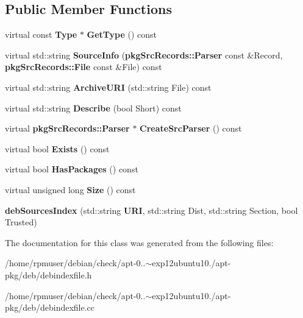 \subsection*{\-Public \-Member \-Functions}
\begin{DoxyCompactItemize}
\item 
virtual const {\bf \-Type} $\ast$ {\bfseries \-Get\-Type} () const \label{classdebSourcesIndex_a97e9791ce2bb129d7b03dfe2f55de366}

\item 
virtual std\-::string {\bfseries \-Source\-Info} ({\bf pkg\-Src\-Records\-::\-Parser} const \&\-Record, {\bf pkg\-Src\-Records\-::\-File} const \&\-File) const \label{classdebSourcesIndex_aa664249fc20599616314f091fc9a1cd0}

\item 
virtual std\-::string {\bfseries \-Archive\-U\-R\-I} (std\-::string \-File) const \label{classdebSourcesIndex_ac797e5aad2fdbc2462e14647d924185e}

\item 
virtual std\-::string {\bfseries \-Describe} (bool \-Short) const \label{classdebSourcesIndex_a1d76db0d4174d2926a4c5af85e1019d9}

\item 
virtual {\bf pkg\-Src\-Records\-::\-Parser} $\ast$ {\bfseries \-Create\-Src\-Parser} () const \label{classdebSourcesIndex_a890bdfc36ac222b8f39447648fdbe142}

\item 
virtual bool {\bfseries \-Exists} () const \label{classdebSourcesIndex_aa746a17c5bebccb81d72dccb29948ec4}

\item 
virtual bool {\bfseries \-Has\-Packages} () const \label{classdebSourcesIndex_a3529b24d8d4f049bd120b93d56d467d0}

\item 
virtual unsigned long {\bfseries \-Size} () const \label{classdebSourcesIndex_ab1050fe2604ef4e6cba6491de8a9f708}

\item 
{\bfseries deb\-Sources\-Index} (std\-::string {\bf \-U\-R\-I}, std\-::string \-Dist, std\-::string \-Section, bool \-Trusted)\label{classdebSourcesIndex_ad99a3054a5a91e53a0837320b524da67}

\end{DoxyCompactItemize}


\-The documentation for this class was generated from the following files\-:\begin{DoxyCompactItemize}
\item 
/home/rpmuser/debian/check/apt-\/0..$\sim$exp12ubuntu10./apt-\/pkg/deb/debindexfile.\-h\item 
/home/rpmuser/debian/check/apt-\/0..$\sim$exp12ubuntu10./apt-\/pkg/deb/debindexfile.\-cc\end{DoxyCompactItemize}
